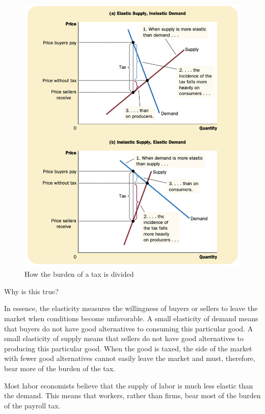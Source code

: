 \begin{figure}[!ht]
  \centering
  \includegraphics[width=\textwidth]{pics/tax3}
  \caption{How the burden of a tax is divided}
  \label{fig:tax3}
\end{figure}



Why is this true?

In essence, the elasticity measures the willingness of buyers or sellers to leave the market when conditions become unfavorable.
A small elasticity of demand means that buyers do not have good alternatives to consuming this particular good.
A small elasticity of supply means that sellers do not have good alternatives to producing this particular good.
When the good is taxed, the side of the market with fewer good alternatives cannot easily leave the market and must, therefore, bear more of the burden of the tax.


\begin{tcolorbox}
Most labor economists believe that the supply of labor is much less elastic than the demand.
This means that workers, rather than firms, bear most of the burden of the payroll tax.   
\end{tcolorbox}

